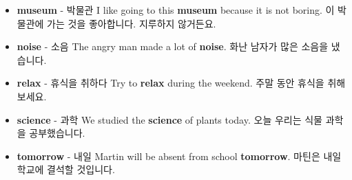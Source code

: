 \documentclass{article}
\begin{document}
\begin{addmargin}[1em]{1em}
\begin{itemize}
        \item \fontsize{12pt}{14pt}\selectfont \textbf{museum} - 박물관 \newline
        I like going to this \textbf{museum} because it is not boring. \newline
        이 박물관에 가는 것을 좋아합니다. 지루하지 않거든요.
        
        \item \fontsize{12pt}{14pt}\selectfont \textbf{noise} - 소음 \newline
        The angry man made a lot of \textbf{noise}. \newline
        화난 남자가 많은 소음을 냈습니다.
        
        \item \fontsize{12pt}{14pt}\selectfont \textbf{relax} - 휴식을 취하다 \newline
        Try to \textbf{relax} during the weekend. \newline
        주말 동안 휴식을 취해보세요.
        
        \item \fontsize{12pt}{14pt}\selectfont \textbf{science} - 과학 \newline
        We studied the \textbf{science} of plants today. \newline
        오늘 우리는 식물 과학을 공부했습니다.
        
        \item \fontsize{12pt}{14pt}\selectfont \textbf{tomorrow} - 내일 \newline
        Martin will be absent from school \textbf{tomorrow}. \newline
        마틴은 내일 학교에 결석할 것입니다.
    \end{itemize}
\end{addmargin}

\newpage

\end{document}
